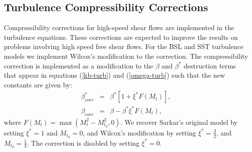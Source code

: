 \subsection{Turbulence Compressibility Corrections}

Compressibility corrections for high-speed shear flows
\cite{Samimy.90,Sarkar.91} are implemented in the turbulence
equations.  These corrections are expected to improve the results on
problems involving high speed free shear flows.  For the BSL and SST
turbulence models we implement Wilcox's \cite{WilcoxBook} modification
to the correction.  The compressibility correction is implemented as a
modification to the $\beta$ and $\beta^*$ destruction terms that
appear in equations (\ref{kb-turb}) and (\ref{omega-turb}) such that
the new constants are given by:
\begin{eqnarray}
\beta^*_{corr}&=& \beta^*[1+\xi^*F(M_t)],\\
\beta_{corr} &=& \beta-\beta^*\xi^* F(M_t),
\end{eqnarray}
where $F(M_t) = \max(M_t^2 - M^2_{t_0},0)$.  We recover Sarkar's
original model by setting $\xi^* = 1$ and $M_{t_0} = 0$, and Wilcox's
modification by setting $\xi^* = \frac{3}{2}$, and $M_{t_0} =
\frac{1}{4}$.  The correction is disabled by setting $\xi^* = 0$.
